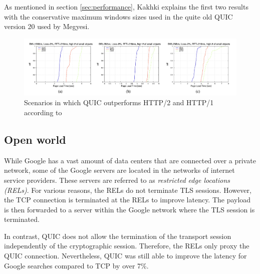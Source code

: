 \documentclass[conference]{IEEEtran}
\begin{document}
As mentioned in section \ref{sec:performance}, Kakhki explains the first two results with the conservative maximum windows sizes used in the quite old QUIC version 20 used by Megyesi.

\begin{figure}[htbp]
\centerline{\includegraphics[width=\textwidth]{images/Megyesi QUIC wins.png}}
\caption{Scenarios in which QUIC outperforms HTTP/2 and HTTP/1 according to \cite{HowQuickIsQuic}}
\label{fig:megyesi-quic-wins}
\end{figure}



\subsection{Open world}

While Google has a vast amount of data centers that are connected over a private network, some of the Google servers are located in the networks of internet service providers. These servers are referred to as \textit{restricted edge locations (RELs)}. For various reasons, the RELs do not terminate TLS sessions. However, the TCP connection is terminated at the RELs to improve latency. The payload is then forwarded to a server within the Google network where the TLS session is terminated. \cite{Google}

In contrast, QUIC does not allow the termination of the transport session independently of the cryptographic session. Therefore, the RELs only proxy the QUIC connection. Nevertheless, QUIC was still able to improve the latency for Google searches compared to TCP by over 7\%. 
\end{document}
